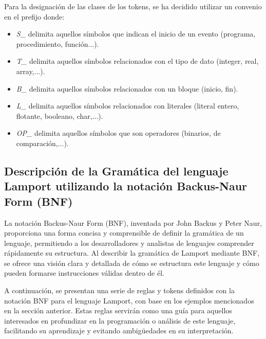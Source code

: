Para la designación de las clases de los tokens, se ha decidido utilizar un convenio en el prefijo donde:

\begin{itemize}
    \item \textit{S\_} delimita aquellos símbolos que indican el inicio de un evento (programa, procedimiento, 
    función...).
    \item \textit{T\_} delimita aquellos símbolos relacionados con el tipo de dato (integer, real, array,...).
    \item \textit{B\_} delimita aquellos símbolos relacionados con un bloque (inicio, fin).
    \item \textit{L\_} delimita aquellos símbolos relacionados con literales (literal entero, flotante, booleano, char,...).
    \item \textit{OP\_} delimita aquellos símbolos que son operadores (binarios, de comparación,...).
\end{itemize}

\subsection{Descripción de la Gramática del lenguaje Lamport utilizando la notación Backus-Naur Form (BNF)}\label{subsec:sintaxisLamport}

La notación Backus-Naur Form (BNF), inventada por John Backus y Peter Naur, proporciona una forma concisa y comprensible de definir la gramática de un lenguaje, permitiendo a los desarrolladores y analistas de lenguajes comprender rápidamente su estructura. Al describir la gramática de Lamport mediante BNF, se ofrece una visión clara y detallada de cómo se estructura este lenguaje y cómo pueden formarse instrucciones válidas dentro de él.



A continuación, se presentan una serie de reglas y tokens definidos con la notación BNF para el lenguaje Lamport, con base en los ejemplos mencionados en la sección anterior. Estas reglas servirán como una guía para aquellos interesados en profundizar en la programación o análisis de este lenguaje, facilitando su aprendizaje y evitando ambigüedades en su interpretación.

\newpage

